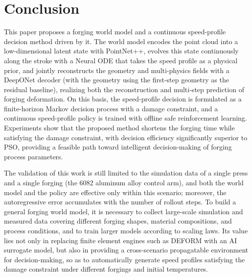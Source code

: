 \section{Conclusion}

This paper proposes a forging world model and a continuous speed-profile decision method driven by it. The world model encodes the point cloud into a low-dimensional latent state with PointNet++, evolves this state continuously along the stroke with a Neural ODE that takes the speed profile as a physical prior, and jointly reconstructs the geometry and multi-physics fields with a DeepONet decoder (with the geometry using the first-step geometry as the residual baseline), realizing both the reconstruction and multi-step prediction of forging deformation. On this basis, the speed-profile decision is formulated as a finite-horizon Markov decision process with a damage constraint, and a continuous speed-profile policy is trained with offline safe reinforcement learning. Experiments show that the proposed method shortens the forging time while satisfying the damage constraint, with decision efficiency significantly superior to PSO, providing a feasible path toward intelligent decision-making of forging process parameters.

The validation of this work is still limited to the simulation data of a single press and a single forging (the 6082 aluminum alloy control arm), and both the world model and the policy are effective only within this scenario; moreover, the autoregressive error accumulates with the number of rollout steps. To build a general forging world model, it is necessary to collect large-scale simulation and measured data covering different forging shapes, material compositions, and process conditions, and to train larger models according to scaling laws. Its value lies not only in replacing finite element engines such as DEFORM with an AI surrogate model, but also in providing a cross-scenario propagatable environment for decision-making, so as to automatically generate speed profiles satisfying the damage constraint under different forgings and initial temperatures.
